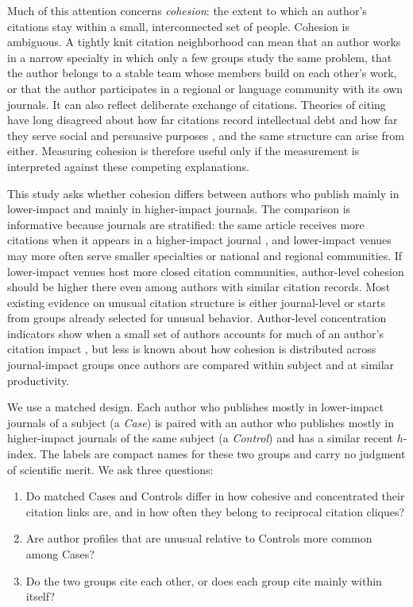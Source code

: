 \documentclass[12pt]{article}
\begin{document}
Much of this attention concerns \emph{cohesion}: the extent to which an author's citations stay within a small, interconnected set of people.  Cohesion is ambiguous.  A tightly knit citation neighborhood can mean that an author works in a narrow specialty in which only a few groups study the same problem, that the author belongs to a stable team whose members build on each other's work, or that the author participates in a regional or language community with its own journals.  It can also reflect deliberate exchange of citations.  Theories of citing have long disagreed about how far citations record intellectual debt and how far they serve social and persuasive purposes \parencite{Merton1988,Gilbert1977,Bornmann2008,Tahamtan2019}, and the same structure can arise from either.  Measuring cohesion is therefore useful only if the measurement is interpreted against these competing explanations.

This study asks whether cohesion differs between authors who publish mainly in lower-impact and mainly in higher-impact journals.  The comparison is informative because journals are stratified: the same article receives more citations when it appears in a higher-impact journal \parencite{Lariviere2010}, and lower-impact venues may more often serve smaller specialties or national and regional communities.  If lower-impact venues host more closed citation communities, author-level cohesion should be higher there even among authors with similar citation records.  Most existing evidence on unusual citation structure is either journal-level \parencite{Kojaku2021,heneberg2016} or starts from groups already selected for unusual behavior.  Author-level concentration indicators show when a small set of authors accounts for much of an author's citation impact \parencite{Evdaimon2024}, but less is known about how cohesion is distributed across journal-impact groups once authors are compared within subject and at similar productivity.

We use a matched design.  Each author who publishes mostly in lower-impact journals of a subject (a \emph{Case}) is paired with an author who publishes mostly in higher-impact journals of the same subject (a \emph{Control}) and has a similar recent $h$-index.  The labels are compact names for these two groups and carry no judgment of scientific merit.  We ask three questions:
\begin{enumerate}
  \item Do matched Cases and Controls differ in how cohesive and concentrated their citation links are, and in how often they belong to reciprocal citation cliques?
  \item Are author profiles that are unusual relative to Controls more common among Cases?
  \item Do the two groups cite each other, or does each group cite mainly within itself?
\end{enumerate}
\end{document}
